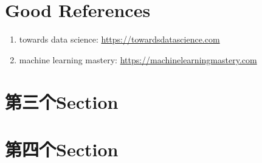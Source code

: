 \documentclass[UTF8,fancyhdr,a4paper]{ctexart}
\begin{document}
\newpage
\section{Good References}
\begin{enumerate}
\item towards data science: \url{https://towardsdatascience.com}
\item machine learning mastery: \url{https://machinelearningmastery.com}

\end{enumerate}

\newpage
\section{第三个Section}

\newpage
\section{第四个Section}
\end{document}
